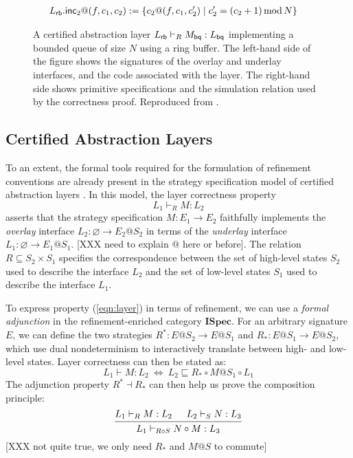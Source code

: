 \documentclass[sigplan,10pt,authordraft]{acmart}
\newcommand{\ISpec}{\mathbf{ISpec}}
\begin{document}
\begin{figure*}
\begin{minipage}{.9\textwidth}
\begin{align*}
        L_{ \mathsf{rb} }. \mathsf{inc} _2@(f, c_1, c_2) &:=
        \{ c_2@(f, c_1, c_2') \mid
           c_2' = (c_2 + 1) \mathop{\mathrm{mod}} N \}
    \end{align*}
  \end{minipage}
  \caption{
    A certified abstraction layer
    $L_{ \mathsf{rb} } \vdash_R M_{ \mathsf{bq} } : L_{ \mathsf{bq} }$
    implementing a bounded queue of size $N$
    using a ring buffer.
    The left-hand side of the figure shows
    the signatures of the overlay and underlay interfaces,
    and the code associated with the layer.
    The right-hand side shows primitive specifications
    and the simulation relation used by the correctness proof.
    Reproduced from \citet{rbgs-cal}.}
  \label{fig:cal}
\end{figure*}

\subsection{Certified Abstraction Layers}\label{sec:mainideas:cal}

To an extent,
the formal tools required for the formulation of refinement conventions
are already present in the strategy specification model
of certified abstraction layers \cite[\S 3.7]{rbgs-cal}.
%
In this model,
the layer correctness property
\begin{equation} \label{eqn:layer}
  L_1 \vdash_R M : L_2
\end{equation}
asserts that the strategy specification
$M : E_1 \rightarrow E_2$
faithfully implements the \emph{overlay} interface
$L_2 : \varnothing \rightarrow E_2@S_2$
in terms of the \emph{underlay} interface
$L_1 : \varnothing \rightarrow E_1@S_1$.
[XXX need to explain $@$ here or before].
The relation $R \subseteq S_2 \times S_1$
specifies the correspondence between
the set of high-level states $S_2$
used to describe the interface $L_2$
and the set of low-level states $S_1$
used to describe the interface $L_1$.

To express property (\ref{eqn:layer})
in terms of refinement,
we can use a \emph{formal adjunction}
in the refinement-enriched category $\ISpec$.
For an arbitrary signature $E$,
we can define the two strategies
$R^* : E@S_2 \rightarrow E@S_1$ and
$R_* : E@S_1 \rightarrow E@S_2$,
which use dual nondeterminism to interactively translate
between high- and low-level states.
Layer correctness can then be stated as:
\[
  L_1 \vdash M : L_2 \: \Leftrightarrow \:
  L_2 \sqsubseteq R_* \circ M@S_1 \circ L_1
\]
The adjunction property $R^* \dashv R_*$
can then help us prove the composition principle:
\[
  \begin{prooftree}
    \hypo{L_1 \vdash_R M : L_2}
    \hypo{L_2 \vdash_S N : L_3}
    \infer2{L_1 \vdash_{R \circ S} N \circ M : L_3}
  \end{prooftree}
\]
[XXX not quite true,
we only need $R_*$ and $M@S$ to commute]
\end{document}
